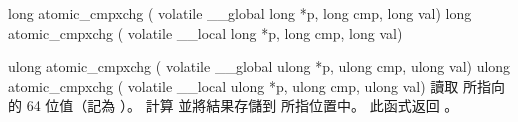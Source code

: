long atomic_cmpxchg (
	volatile __global long *p,
	long cmp, long val)
long atomic_cmpxchg (
	volatile __local long *p,
	long cmp,
	long val)

ulong atomic_cmpxchg (
	volatile __global ulong *p,
	ulong cmp,
	ulong val)
ulong atomic_cmpxchg (
	volatile __local ulong *p,
	ulong cmp,
	ulong val)
\stopbuffer
{}
讀取  所指向的 64 位值（記為 ）。
計算  並將結果存儲到  所指位置中。
此函式返回 。
\stopbuffer


\startCLFD
{}
\stopCLFD
